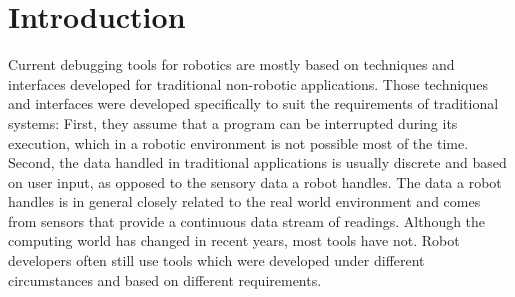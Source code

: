 \chapter{Introduction}


Current debugging tools for robotics are mostly based on techniques and interfaces developed for traditional non-robotic applications. Those techniques and interfaces were developed specifically to suit the requirements of traditional systems: First, they assume that a program can be interrupted during its execution, which in a robotic environment is not possible most of the time. Second, the data handled in traditional applications is usually discrete and based on user input, as opposed to the sensory data a robot handles. The data a robot handles is in general closely related to the real world environment and comes from sensors that provide a continuous data stream of readings. Although the computing world has changed in recent years, most tools have not. Robot developers often still use tools which were developed under different circumstances and based on different requirements.

